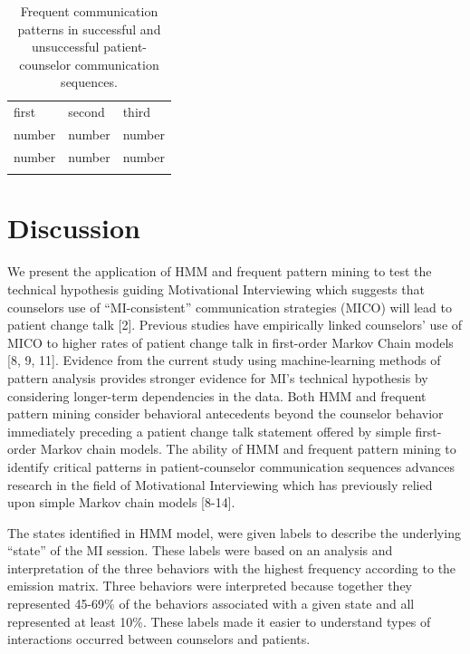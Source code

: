 \begin{table}
\caption{Frequent communication patterns in successful and unsuccessful patient-counselor communication sequences.}
\label{tab:patterns}       %
\begin{tabular}{lll}
\hline\noalign{\smallskip}
first & second & third  \\
\noalign{\smallskip}\hline\noalign{\smallskip}
number & number & number \\
number & number & number \\
\noalign{\smallskip}\hline
\end{tabular}
\end{table}

\section{Discussion}
\label{sec:discussion}
We present the application of HMM and frequent pattern mining to test the technical hypothesis guiding Motivational Interviewing which suggests that counselors use of “MI-consistent” communication strategies (MICO) will lead to patient change talk [2]. Previous studies have empirically linked counselors’ use of MICO to higher rates of patient change talk in first-order Markov Chain models [8, 9, 11]. Evidence from the current study using machine-learning methods of pattern analysis provides stronger evidence for MI’s technical hypothesis by considering longer-term dependencies in the data. Both HMM and frequent pattern mining consider behavioral antecedents beyond the counselor behavior immediately preceding a patient change talk statement offered by simple first-order Markov chain models. The ability of HMM and frequent pattern mining to identify critical patterns in patient-counselor communication sequences advances research in the field of Motivational Interviewing which has previously relied upon simple Markov chain models [8-14].

The states identified in HMM model, were given labels to describe the underlying “state” of the MI session. These labels were based on an analysis and interpretation of the three behaviors with the highest frequency according to the emission matrix. Three behaviors were interpreted because together they represented 45-69\% of the behaviors associated with a given state and all represented at least 10\%. These labels made it easier to understand types of interactions occurred between counselors and patients. 

